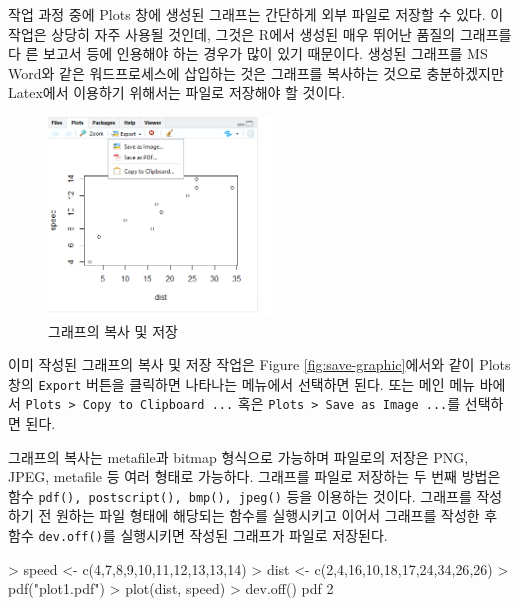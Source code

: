 \documentclass[
]{book}
\newenvironment{Shaded}{\begin{snugshade}}{\end{snugshade}}
\newcommand{\DecValTok}[1]{\textcolor[rgb]{0.00,0.00,0.81}{#1}}
\newcommand{\FunctionTok}[1]{\textcolor[rgb]{0.00,0.00,0.00}{#1}}
\newcommand{\NormalTok}[1]{#1}
\newcommand{\OtherTok}[1]{\textcolor[rgb]{0.56,0.35,0.01}{#1}}
\newcommand{\SpecialCharTok}[1]{\textcolor[rgb]{0.00,0.00,0.00}{#1}}
\newcommand{\StringTok}[1]{\textcolor[rgb]{0.31,0.60,0.02}{#1}}
\begin{document}
작업 과정 중에 Plots 창에 생성된 그래프는 간단하게 외부 파일로 저장할 수
있다. 이 작업은 상당히 자주 사용될 것인데, 그것은 R에서 생성된 매우
뛰어난 품질의 그래프를 다 른 보고서 등에 인용해야 하는 경우가 많이 있기
때문이다. 생성된 그래프를 MS Word와 같은 워드프로세스에 삽입하는 것은
그래프를 복사하는 것으로 충분하겠지만 Latex에서 이용하기 위해서는 파일로
저장해야 할 것이다.

\begin{figure}
\hypertarget{save-graphic}{%
\centering
\includegraphics[width=2.34375in,height=\textheight]{Figure/save_graphic.png}
\caption{그래프의 복사 및
저장}\label{save-graphic}
}
\end{figure}

이미 작성된 그래프의 복사 및 저장 작업은 Figure
\ref{fig:save-graphic}에서와 같이 Plots 창의 \texttt{Export} 버튼을 클릭하면
나타나는 메뉴에서 선택하면 된다. 또는 메인 메뉴 바에서
\texttt{Plots\ \textgreater{}\ Copy\ to\ Clipboard\ ...} 혹은 \texttt{Plots\ \textgreater{}\ Save\ as\ Image\ ...}를
선택하면 된다.

그래프의 복사는 metafile과 bitmap 형식으로 가능하며 파일로의 저장은 PNG,
JPEG, metafile 등 여러 형태로 가능하다. 그래프를 파일로 저장하는 두 번째
방법은 함수 \texttt{pdf(),\ postscript(),\ bmp(),\ jpeg()} 등을 이용하는 것이다.
그래프를 작성하기 전 원하는 파일 형태에 해당되는 함수를 실행시키고
이어서 그래프를 작성한 후 함수 \texttt{dev.off()}를 실행시키면 작성된 그래프가
파일로 저장된다.

\begin{Shaded}
\begin{Highlighting}[]
\SpecialCharTok{\textgreater{}}\NormalTok{ speed }\OtherTok{\textless{}{-}} \FunctionTok{c}\NormalTok{(}\DecValTok{4}\NormalTok{,}\DecValTok{7}\NormalTok{,}\DecValTok{8}\NormalTok{,}\DecValTok{9}\NormalTok{,}\DecValTok{10}\NormalTok{,}\DecValTok{11}\NormalTok{,}\DecValTok{12}\NormalTok{,}\DecValTok{13}\NormalTok{,}\DecValTok{13}\NormalTok{,}\DecValTok{14}\NormalTok{)}
\SpecialCharTok{\textgreater{}}\NormalTok{ dist }\OtherTok{\textless{}{-}} \FunctionTok{c}\NormalTok{(}\DecValTok{2}\NormalTok{,}\DecValTok{4}\NormalTok{,}\DecValTok{16}\NormalTok{,}\DecValTok{10}\NormalTok{,}\DecValTok{18}\NormalTok{,}\DecValTok{17}\NormalTok{,}\DecValTok{24}\NormalTok{,}\DecValTok{34}\NormalTok{,}\DecValTok{26}\NormalTok{,}\DecValTok{26}\NormalTok{)}
\SpecialCharTok{\textgreater{}} \FunctionTok{pdf}\NormalTok{(}\StringTok{"plot1.pdf"}\NormalTok{)}
\SpecialCharTok{\textgreater{}} \FunctionTok{plot}\NormalTok{(dist, speed)}
\SpecialCharTok{\textgreater{}} \FunctionTok{dev.off}\NormalTok{()}
\NormalTok{pdf }
  \DecValTok{2} 
\end{Highlighting}
\end{Shaded}
\end{document}
